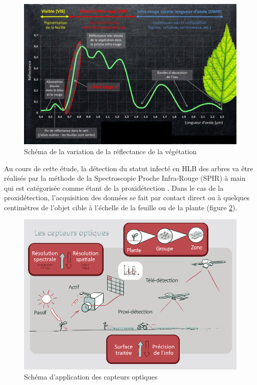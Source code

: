 \documentclass[
  11pt,
  french,
  a4paper,
  extrafontsizes,onecolumn,openright
  ]{memoir}
\begin{document}
\begin{figure}

{\centering \includegraphics[width=0.8\linewidth]{Images/Figure7} 

}

\caption{Schéma de la variation de la réflectance de la végétation}\label{fig:7}
\end{figure}

\normalsize

Au cours de cette étude, la détection du statut infecté en HLB des arbres va être réalisés par la méthode de la Spectroscopie Proche Infra-Rouge (SPIR) à main qui est catégorisée comme étant de la proxidétection \autocite{albetis_de_la_cruz_potentiel_2018}.
Dans le cas de la proxidétection, l'acquisition des données se fait par contact direct ou à quelques centimètres de l'objet cible à l'échelle de la feuille ou de la plante (figure \ref{fig:8}).

\scriptsize

\begin{figure}

{\centering \includegraphics[width=0.8\linewidth]{Images/Figure8} 

}

\caption{Schéma d’application des capteurs optiques}\label{fig:8}
\end{figure}
\end{document}

